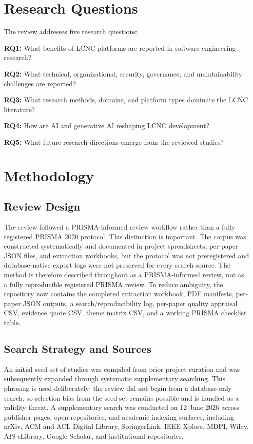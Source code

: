\documentclass[conference]{IEEEtran}
\begin{document}
\section{Research Questions}
The review addresses five research questions:

\textbf{RQ1:} What benefits of LCNC platforms are reported in software engineering research?

\textbf{RQ2:} What technical, organizational, security, governance, and maintainability challenges are reported?

\textbf{RQ3:} What research methods, domains, and platform types dominate the LCNC literature?

\textbf{RQ4:} How are AI and generative AI reshaping LCNC development?

\textbf{RQ5:} What future research directions emerge from the reviewed studies?

\section{Methodology}
\subsection{Review Design}
The review followed a PRISMA-informed review workflow rather than a fully registered PRISMA 2020 protocol. This distinction is important. The corpus was constructed systematically and documented in project spreadsheets, per-paper JSON files, and extraction workbooks, but the protocol was not preregistered and database-native export logs were not preserved for every search source. The method is therefore described throughout as a PRISMA-informed review, not as a fully reproducible registered PRISMA review. To reduce ambiguity, the repository now contains the completed extraction workbook, PDF manifests, per-paper JSON outputs, a search/reproducibility log, per-paper quality appraisal CSV, evidence quote CSV, theme matrix CSV, and a working PRISMA checklist table.

\subsection{Search Strategy and Sources}
An initial seed set of studies was compiled from prior project curation and was subsequently expanded through systematic supplementary searching. This phrasing is used deliberately: the review did not begin from a database-only search, so selection bias from the seed set remains possible and is handled as a validity threat. A supplementary search was conducted on 12 June 2026 across publisher pages, open repositories, and academic indexing surfaces, including arXiv, ACM and ACL Digital Library, SpringerLink, IEEE Xplore, MDPI, Wiley, AIS eLibrary, Google Scholar, and institutional repositories.
\end{document}
